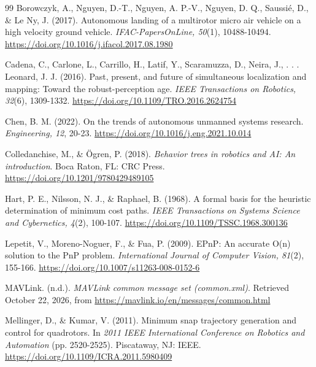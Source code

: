 \begin{thebibliography}{99}
Borowczyk, A., Nguyen, D.-T., Nguyen, A. P.-V., Nguyen, D. Q., Saussi{\'e}, D., \& Le Ny, J. (2017). Autonomous landing of a multirotor micro air vehicle on a high velocity ground vehicle. \textit{IFAC-PapersOnLine, 50}(1), 10488-10494. \url{https://doi.org/10.1016/j.ifacol.2017.08.1980}

Cadena, C., Carlone, L., Carrillo, H., Latif, Y., Scaramuzza, D., Neira, J., . . . Leonard, J. J. (2016). Past, present, and future of simultaneous localization and mapping: Toward the robust-perception age. \textit{IEEE Transactions on Robotics, 32}(6), 1309-1332. \url{https://doi.org/10.1109/TRO.2016.2624754}

Chen, B. M. (2022). On the trends of autonomous unmanned systems research. \textit{Engineering, 12}, 20-23. \url{https://doi.org/10.1016/j.eng.2021.10.014}

Colledanchise, M., \& {\"O}gren, P. (2018). \textit{Behavior trees in robotics and AI: An introduction}. Boca Raton, FL: CRC Press. \url{https://doi.org/10.1201/9780429489105}

Hart, P. E., Nilsson, N. J., \& Raphael, B. (1968). A formal basis for the heuristic determination of minimum cost paths. \textit{IEEE Transactions on Systems Science and Cybernetics, 4}(2), 100-107. \url{https://doi.org/10.1109/TSSC.1968.300136}

Lepetit, V., Moreno-Noguer, F., \& Fua, P. (2009). EPnP: An accurate O(n) solution to the PnP problem. \textit{International Journal of Computer Vision, 81}(2), 155-166. \url{https://doi.org/10.1007/s11263-008-0152-6}

MAVLink. (n.d.). \textit{MAVLink common message set (common.xml)}. Retrieved October 22, 2026, from \url{https://mavlink.io/en/messages/common.html}

Mellinger, D., \& Kumar, V. (2011). Minimum snap trajectory generation and control for quadrotors. In \textit{2011 IEEE International Conference on Robotics and Automation} (pp. 2520-2525). Piscataway, NJ: IEEE. \url{https://doi.org/10.1109/ICRA.2011.5980409}


\end{thebibliography}
